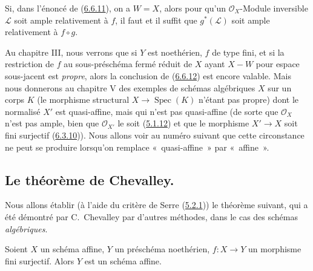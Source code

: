 \begin{corollary}[6.6.12]
\label{II.6.6.12-fr}
Si, dans l'énoncé de (\hyperref[II.6.6.11-fr]{6.6.11}), on a $W=X$, alors
pour qu'un $\mathcal{O}_X$-Module inversible $\mathcal{L}$ soit ample
relativement à $f$, il faut et il suffit que $g^*(\mathcal{L})$ soit ample
relativement à $f\circ g$.
\end{corollary}

\begin{remark}[6.6.13]
\label{II.6.6.13-fr}
Au chapitre III, nous verrons que si $Y$ est noethérien, $f$ de type fini, et
si la restriction de $f$ au sous-préschéma fermé réduit de $X$ ayant $X-W$
pour espace sous-jacent est \emph{propre}, alors la conclusion de
(\hyperref[II.6.6.12-fr]{6.6.12}) est encore valable. Mais nous donnerons au
chapitre V des exemples de schémas algébriques $X$ sur un corps $K$ (le
morphisme structural $X\to\operatorname{Spec}(K)$ n'étant pas propre) dont
le normalisé $X'$ est quasi-affine, mais qui n'est pas quasi-affine (de sorte
que $\mathcal{O}_X$ n'est pas ample, bien que $\mathcal{O}_{X'}$ le soit
(\hyperref[II.5.1.12-fr]{5.1.12}) et que le morphisme $X'\to X$ soit fini
surjectif (\hyperref[II.6.3.10-fr]{6.3.10})). Nous allons voir au numéro
suivant que cette circonstance ne peut se produire lorsqu'on remplace
«~quasi-affine~» par «~affine~».
\end{remark}

\subsection{Le théorème de Chevalley.}
\label{subsection:II.6.7-fr}

Nous allons établir (à l'aide du critère de Serre
(\hyperref[II.5.2.1-fr]{5.2.1})) le théorème suivant, qui a été démontré par
C.~Chevalley par d'autres méthodes, dans le cas des schémas
\emph{algébriques}.


\begin{theorem}[6.7.1]
\label{II.6.7.1-fr}
Soient $X$ un schéma affine, $Y$ un préschéma noethérien, $f:X\to Y$ un
morphisme fini surjectif. Alors $Y$ est un schéma affine.
\end{theorem}

